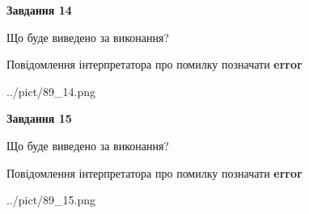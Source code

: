 \documentclass[11pt, ukrainian]{article}
\begin{document}
{\begin {large}
{\begin {center}\textbf{Завдання 14}\end {center}}\par
Що буде виведено за виконання? \par
Повідомлення інтерпретатора про помилку позначати \textbf{error}

\begin{center}
	{../pict/89_14.png}
\end{center}
\newpage

{\begin {center}\textbf{Завдання 15}\end {center}}\par
Що буде виведено за виконання? \par
Повідомлення інтерпретатора про помилку позначати \textbf{error}

\begin{center}
	{../pict/89_15.png}
\end{center}
\newpage

\end {large}}
\end{document}
